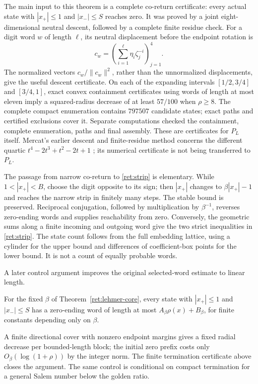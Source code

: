 The main input to this theorem is a complete co-return certificate: every actual state with $|x_+|\leq1$ and $|x_-|\leq S$ reaches zero.
It was proved by a joint eight-dimensional neutral descent, followed by a complete finite residue check.
For a digit word $w$ of length $\ell$, its neutral displacement before the endpoint rotation is
\[
 c_w=\left(\sum_{i=1}^{\ell}\eta_i\zeta_j^{-i}\right)_{j=1}^4.
\]
The normalized vectors $c_w/\lVert c_w\rVert^2$, rather than the unnormalized displacements, give the useful descent certificate.
On each of the expanding intervals $[1/2,3/4]$ and $[3/4,1]$, exact convex containment certificates using words of length at most eleven imply a squared-radius decrease of at least $57/100$ when $\rho\geq8$.
The complete compact enumeration contains $797507$ candidate states; exact paths and certified exclusions cover it.
Separate computations checked the containment, complete enumeration, paths and final assembly.
These are certificates for $P_L$ itself.
Mercat's earlier descent and finite-residue method concerns the different quartic $t^4-2t^3+t^2-2t+1$ \cite[Proposition~4.23]{Mer13}; its numerical certificate is not being transferred to $P_L$.

The passage from narrow co-return to \eqref{ret:strip} is elementary.
While $1<|x_+|<B$, choose the digit opposite to its sign; then $|x_+|$ changes to $\beta|x_+|-1$ and reaches the narrow strip in finitely many steps.
The stable bound is preserved.
Reciprocal conjugation, followed by multiplication by $\beta^{-1}$, reverses zero-ending words and supplies reachability from zero.
Conversely, the geometric sums along a finite incoming and outgoing word give the two strict inequalities in \eqref{ret:strip}.
The state count follows from the full embedding lattice, using a cylinder for the upper bound and differences of coefficient-box points for the lower bound.
It is not a count of equally probable words.

A later control argument improves the original selected-word estimate to linear length.
\begin{proposition}\label{ret:linear-control}
For the fixed $\beta$ of Theorem~\ref{ret:lehmer-core}, every state with $|x_+|\le1$ and $|x_-|\le S$ has a zero-ending word of length at most $A_\beta\rho(x)+B_\beta$, for finite constants depending only on $\beta$.
\end{proposition}
A finite directional cover with nonzero endpoint margins gives a fixed radial decrease per bounded-length block; the initial zero prefix costs only $O_\beta(\log(1+\rho))$ by the integer norm.
The finite termination certificate above closes the argument.
The same control is conditional on compact termination for a general Salem number below the golden ratio.

